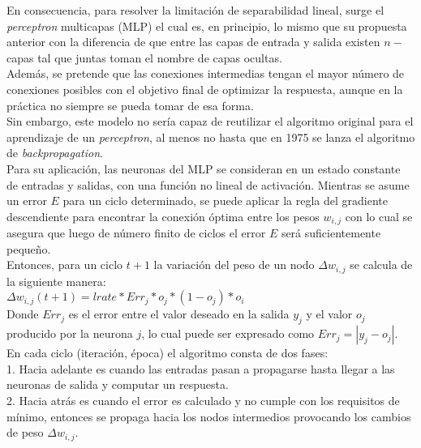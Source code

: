 \documentclass{llncs}
\begin{document}
\begin{multicols}{2}[]
En consecuencia, para resolver la limitaci\'on de separabilidad lineal, surge el \textit{perceptron} multicapas (MLP) el cual es, en principio, lo mismo que su propuesta
anterior con la diferencia de que entre las capas de entrada y salida existen $n-$capas tal que juntas toman el nombre de capas ocultas.\\
Adem\'as, se pretende que las conexiones intermedias tengan el mayor n\'umero de conexiones posibles con el objetivo final de optimizar la respuesta, aunque
en la pr\'actica no siempre se pueda tomar de esa forma.\\


Sin embargo, este modelo no ser\'ia capaz de reutilizar el algoritmo original para el aprendizaje de un \textit{perceptron}, al menos no hasta que en 1975 se lanza el
algoritmo de \textit{backpropagation}. \\

Para su aplicaci\'on, las neuronas del MLP se consideran en un estado constante de entradas y salidas, con una funci\'on no lineal de activaci\'on. Mientras se
asume un error $E$ para un ciclo determinado, se puede aplicar la regla del gradiente descendiente para encontrar la conexi\'on \'optima entre los pesos $w_{i,j}$
con lo cual se asegura que luego de n\'umero finito de ciclos el error $E$ ser\'a suficientemente peque\~no.\\

Entonces, para un ciclo $t+1$ la variaci\'on del peso de un nodo $\Delta w_{i,j}$ se calcula de la siguiente manera: \\

$\Delta w_{i,j} (t + 1) = lrate * Err_{j} * o_j * (1 - o_j) * o_i$ \\

Donde $Err_j$ es el error entre el valor deseado en la salida $y_j$ y el valor $o_j$ producido por la neurona $j$, lo cual puede ser expresado como $Err_j = |y_j - o_j|$. \\

En cada ciclo (iteraci\'on, \'epoca) el algoritmo consta de dos fases:\\

1. Hacia adelante es cuando las entradas pasan a propagarse hasta llegar a las neuronas de salida y computar un respuesta. \\

2. Hacia atr\'as es cuando el error es calculado y no cumple con los requisitos de m\'inimo, entonces se propaga hacia los nodos intermedios provocando los cambios
de peso $\Delta w_{i,j}.$\\


\end{multicols}
\end{document}
